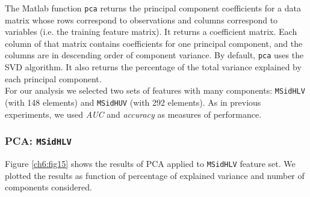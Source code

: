 The Matlab function \texttt{pca} returns the principal component coefficients for a data matrix whose rows correspond to observations and columns correspond to variables (i.e. the training feature matrix).
It returns a coefficient matrix. Each column of that matrix contains coefficients for one principal component, and the columns are in descending order of component variance.
By default, \texttt{pca} uses the \Gls{SVD} algorithm. It also returns the percentage of the total variance explained by each principal component.\\
For our analysis we selected two sets of features with many components: \texttt{MSidHLV} (with 148 elements) and \texttt{MSidHUV} (with 292 elements). As in previous experiments,
we used \textit{AUC} and \textit{accuracy} as measures of performance.

\vspace{0.5cm}

\subsubsection{PCA: \texttt{MSidHLV}}

Figure \ref{ch6:fig15} shows the results of \Gls{PCA} applied to \texttt{MSidHLV} feature set. We plotted the results as function of percentage of
explained variance and number of components considered.

